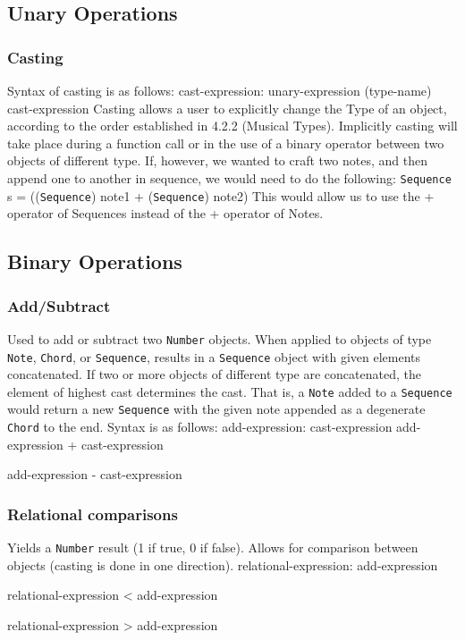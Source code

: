 \documentclass[12pt,A4]{book}
\begin{document}
\subsection{Unary Operations}
\subsubsection{Casting}
Syntax of casting is as follows:
cast-expression: unary-expression
(type-name) cast-expression
Casting allows a user to explicitly change the Type of an object, according to the order established in 4.2.2 (Musical Types). Implicitly casting will take place during a function call or in the use of a binary operator between two objects of different type. If, however, we wanted to craft two notes, and then append one to another in sequence, we would need to do the following:
\verb|Sequence| s = ((\verb|Sequence|) note1 + (\verb|Sequence|) note2)
This would allow us to use the + operator of Sequences instead of the + operator of Notes.
\subsection{Binary Operations}
\subsubsection{Add/Subtract}
Used to add or subtract two \verb|Number| objects. When applied to objects of type \verb|Note|, \verb|Chord|, or \verb|Sequence|, results in a \verb|Sequence| object with given elements concatenated. If two or more objects of different type are concatenated, the element of highest cast determines the cast. That is, a \verb|Note| added to a \verb|Sequence| would return a new \verb|Sequence| with the given note appended as a degenerate \verb|Chord| to the end.
Syntax is as follows:
add-expression: cast-expression
              add-expression + cast-expression

add-expression - cast-expression
\subsubsection{Relational comparisons}
Yields a \verb|Number| result (1 if true, 0 if false). Allows for comparison between objects (casting is done in one direction).
relational-expression:    add-expression

relational-expression < add-expression

relational-expression > add-expression
\end{document}
